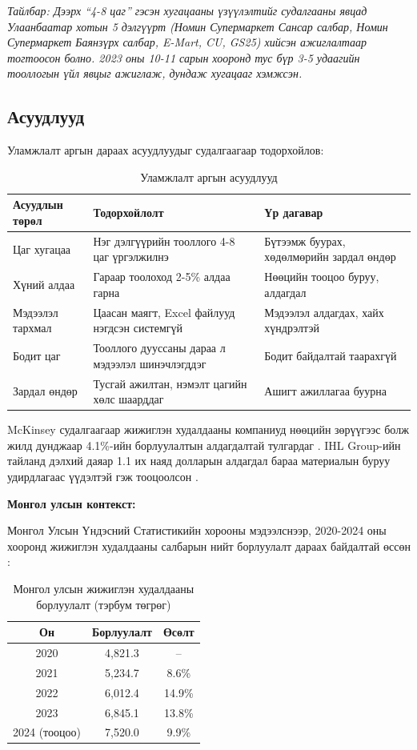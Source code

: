 \textit{Тайлбар: Дээрх ``4-8 цаг'' гэсэн хугацааны үзүүлэлтийг судалгааны явцад Улаанбаатар хотын 5 дэлгүүрт (Номин Супермаркет Сансар салбар, Номин Супермаркет Баянзүрх салбар, E-Mart, CU, GS25) хийсэн ажиглалтаар тогтоосон болно. 2023 оны 10-11 сарын хооронд тус бүр 3-5 удаагийн тооллогын үйл явцыг ажиглаж, дундаж хугацааг хэмжсэн.}

\subsection{Асуудлууд}

Уламжлалт аргын дараах асуудлуудыг судалгаагаар тодорхойлов:

\begin{longtable}{|P{0.20}|P{0.34}|P{0.38}|}
\caption{Уламжлалт аргын асуудлууд}
\label{tab:problems} \\
\hline
\textbf{Асуудлын төрөл} & \textbf{Тодорхойлолт} & \textbf{Үр дагавар} \\
\hline
Цаг хугацаа & Нэг дэлгүүрийн тооллого 4-8 цаг үргэлжилнэ & Бүтээмж буурах, хөдөлмөрийн зардал өндөр \\
\hline
Хүний алдаа & Гараар тоолоход 2-5\% алдаа гарна \cite{zebra_study} & Нөөцийн тооцоо буруу, алдагдал \\
\hline
Мэдээлэл тархмал & Цаасан маягт, Excel файлууд нэгдсэн системгүй & Мэдээлэл алдагдах, хайх хүндрэлтэй \\
\hline
Бодит цаг & Тооллого дууссаны дараа л мэдээлэл шинэчлэгддэг & Бодит байдалтай таарахгүй \\
\hline
Зардал өндөр & Тусгай ажилтан, нэмэлт цагийн хөлс шаарддаг & Ашигт ажиллагаа буурна \\
\hline
\end{longtable}

McKinsey судалгаагаар жижиглэн худалдааны компаниуд нөөцийн зөрүүгээс болж жилд дунджаар 4.1\%-ийн борлуулалтын алдагдалтай тулгардаг \cite{mckendrick_ai}. IHL Group-ийн тайланд дэлхий даяар 1.1 их наяд долларын алдагдал бараа материалын буруу удирдлагаас үүдэлтэй гэж тооцоолсон \cite{ihl_report}.

\textbf{Монгол улсын контекст:}

Монгол Улсын Үндэсний Статистикийн хорооны мэдээлснээр, 2020-2024 оны хооронд жижиглэн худалдааны салбарын нийт борлуулалт дараах байдалтай өссөн \cite{nso_mongolia}:

\begin{table}[H]
\centering
\caption{Монгол улсын жижиглэн худалдааны борлуулалт (тэрбум төгрөг)}
\label{tab:mongolia_retail}
\begin{tabular}{|c|c|c|}
\hline
\textbf{Он} & \textbf{Борлуулалт} & \textbf{Өсөлт} \\
\hline
2020 & 4,821.3 & -- \\
\hline
2021 & 5,234.7 & 8.6\% \\
\hline
2022 & 6,012.4 & 14.9\% \\
\hline
2023 & 6,845.1 & 13.8\% \\
\hline
2024 (тооцоо) & 7,520.0 & 9.9\% \\
\hline
\end{tabular}
\end{table}

